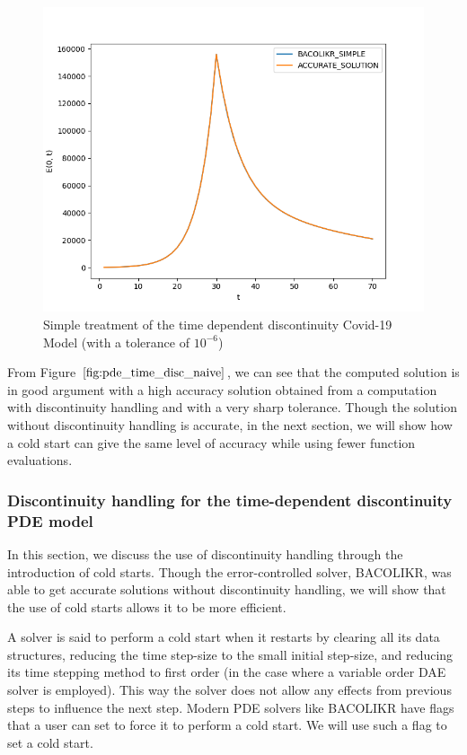 \documentclass{article}
\begin{document}
\begin{figure}[H]
\centering
\includegraphics[width=0.7\linewidth]{./figures/pde_time_disc_naive}
\caption{Simple treatment of the time dependent discontinuity Covid-19 Model (with a tolerance of $10^{-6}$)}
\label{fig:pde_time_disc_naive}
\end{figure}

From Figure $\ref{fig:pde_time_disc_naive}$, we can see that the computed solution is in good argument with a high accuracy solution obtained from a computation with discontinuity handling and with a very sharp tolerance. Though the solution without discontinuity handling is accurate, in the next section, we will show how a cold start can give the same level of accuracy while using fewer function evaluations.

\subsubsection{Discontinuity handling for the time-dependent discontinuity PDE model}
\label{subsubsection:pde_time_disc_hand}
In this section, we discuss the use of discontinuity handling through the introduction of cold starts. Though the error-controlled solver, BACOLIKR, was able to get accurate solutions without discontinuity handling, we will show that the use of cold starts allows it to be more efficient.

A solver is said to perform a cold start when it restarts by clearing all its data structures, reducing the time step-size to the small initial step-size, and reducing its time stepping method to first order (in the case where a variable order DAE solver is employed). This way the solver does not allow any effects from previous steps to influence the next step. Modern PDE solvers like BACOLIKR have flags that a user can set to force it to perform a cold start. We will use such a flag to set a cold start.
\end{document}
